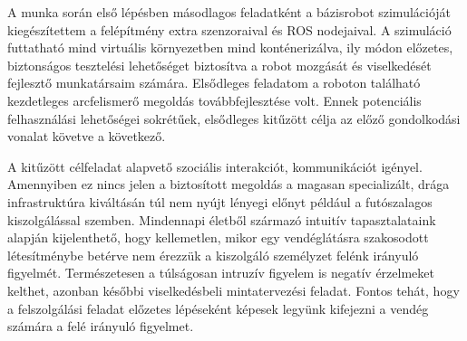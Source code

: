 A munka során első lépésben másodlagos feladatként a bázisrobot szimulációját kiegészítettem a felépítmény extra szenzoraival és ROS nodejaival. A szimuláció futtatható mind virtuális környezetben mind konténerizálva, ily módon előzetes, biztonságos tesztelési lehetőséget biztosítva a robot mozgását és viselkedését fejlesztő munkatársaim számára. Elsődleges feladatom a roboton található kezdetleges arcfelismerő megoldás továbbfejlesztése volt. Ennek potenciális felhasználási lehetőségei sokrétűek, elsődleges kitűzött célja az előző gondolkodási vonalat követve a következő.

A kitűzött célfeladat alapvető szociális interakciót, kommunikációt igényel. Amennyiben ez nincs jelen a biztosított megoldás a magasan specializált, drága infrastruktúra kiváltásán túl nem nyújt lényegi előnyt például a futószalagos kiszolgálással szemben. Mindennapi életből származó intuitív tapasztalataink alapján kijelenthető, hogy kellemetlen, mikor egy vendéglátásra szakosodott létesítménybe betérve nem érezzük a kiszolgáló személyzet felénk irányuló figyelmét. Természetesen a túlságosan intruzív figyelem is negatív érzelmeket kelthet, azonban későbbi viselkedésbeli mintatervezési feladat. Fontos tehát, hogy a felszolgálási feladat előzetes lépéseként képesek legyünk kifejezni a vendég számára a felé irányuló figyelmet.

